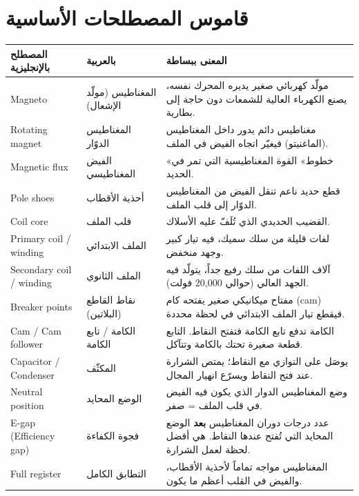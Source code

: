 \documentclass[11pt,a4paper]{article}
\newcommand{\en}[1]{\textenglish{#1}}
\begin{document}
\section{قاموس المصطلحات الأساسية}

\begin{longtable}{|>{\raggedleft\arraybackslash}p{4.2cm}|>{\raggedleft\arraybackslash}p{3.6cm}|>{\raggedleft\arraybackslash}p{7.2cm}|}
\hline
\textbf{المصطلح بالإنجليزية} & \textbf{بالعربية} & \textbf{المعنى ببساطة}\\\hline\endhead
\en{Magneto} & المغناطيس (مولّد الإشعال) & مولّد كهربائي صغير يديره المحرك نفسه، يصنع الكهرباء العالية للشمعات دون حاجة إلى بطارية.\\\hline
\en{Rotating magnet} & المغناطيس الدوّار & مغناطيس دائم يدور داخل المغناطيس (الماغنيتو) فيغيّر اتجاه الفيض في الملف.\\\hline
\en{Magnetic flux} & الفيض المغناطيسي & «خطوط» القوة المغناطيسية التي تمر في الحديد.\\\hline
\en{Pole shoes} & أحذية الأقطاب & قطع حديد ناعم تنقل الفيض من المغناطيس الدوّار إلى قلب الملف.\\\hline
\en{Coil core} & قلب الملف & القضيب الحديدي الذي تُلَفّ عليه الأسلاك.\\\hline
\en{Primary coil / winding} & الملف الابتدائي & لفات قليلة من سلك سميك، فيه تيار كبير وجهد منخفض.\\\hline
\en{Secondary coil / winding} & الملف الثانوي & آلاف اللفات من سلك رفيع جداً، يتولّد فيه الجهد العالي (حوالي 20,000 فولت).\\\hline
\en{Breaker points} & نقاط القاطع (البلاتين) & مفتاح ميكانيكي صغير يفتحه كام (\en{cam}) فيقطع تيار الملف الابتدائي في لحظة محددة.\\\hline
\en{Cam / Cam follower} & الكامة / تابع الكامة & الكامة تدفع تابع الكامة فتفتح النقاط. التابع قطعة صغيرة تحتك بالكامة وتتآكل.\\\hline
\en{Capacitor / Condenser} & المكثّف & يوصَل على التوازي مع النقاط؛ يمتص الشرارة عند فتح النقاط ويسرّع انهيار المجال.\\\hline
\en{Neutral position} & الوضع المحايد & وضع المغناطيس الدوار الذي يكون فيه الفيض في قلب الملف = صفر.\\\hline
\en{E-gap (Efficiency gap)} & فجوة الكفاءة & عدد درجات دوران المغناطيس \textbf{بعد} الوضع المحايد التي تُفتح عندها النقاط. هي أفضل لحظة لعمل الشرارة.\\\hline
\en{Full register} & التطابق الكامل & المغناطيس مواجه تماماً لأحذية الأقطاب، والفيض في القلب أعظم ما يكون.\\\hline

\end{longtable}
\end{document}
